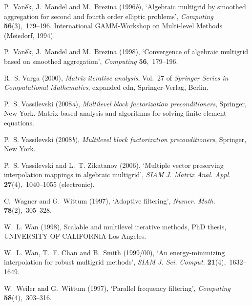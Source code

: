 \documentclass[12pt]{acta_2011xz}
\begin{document}
\begin{thebibliography}{xx}
P.~Van{\v{e}}k, J.~Mandel and M.~Brezina  (1996{\em b}), `Algebraic multigrid
  by smoothed aggregation for second and fourth order elliptic problems', {\em
  Computing} {\bf 56}(3),~179--196.
\newblock International GAMM-Workshop on Multi-level Methods (Meisdorf, 1994).

P.~Van{\v{e}}k, J.~Mandel and M.~Brezina  (1998), `Convergence of algebraic
  multigrid based on smoothed aggregation', {\em Computing} {\bf 56},~179--196.

R.~S. Varga  (2000), {\em Matrix iterative analysis}, Vol.~27 of {\em Springer
  Series in Computational Mathematics}, expanded edn, Springer-Verlag, Berlin.

P.~S. Vassilevski  (2008{\em a}), {\em Multilevel block factorization
  preconditioners}, Springer, New York.
\newblock Matrix-based analysis and algorithms for solving finite element
  equations.

P.~S. Vassilevski  (2008{\em b}), {\em Multilevel block factorization
  preconditioners}, Springer, New York.

P.~S. Vassilevski and L.~T. Zikatanov  (2006), `Multiple vector preserving
  interpolation mappings in algebraic multigrid', {\em SIAM J. Matrix Anal.
  Appl.} {\bf 27}(4),~1040--1055 (electronic).

C.~Wagner and G.~Wittum  (1997), `Adaptive filtering', {\em Numer. Math.} {\bf
  78}(2),~305--328.

W.~L. Wan  (1998), Scalable and multilevel iterative methods, PhD thesis,
  UNIVERSITY OF CALIFORNIA Los Angeles.

W.~L. Wan, T.~F. Chan and B.~Smith  (1999/00), `An energy-minimizing
  interpolation for robust multigrid methods', {\em SIAM J. Sci. Comput.} {\bf
  21}(4),~1632--1649.

W.~Weiler and G.~Wittum  (1997), `Parallel frequency filtering', {\em
  Computing} {\bf 58}(4),~303--316.


\end{thebibliography}
\end{document}
